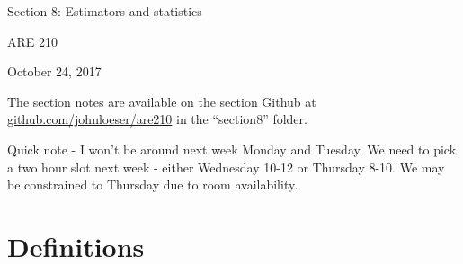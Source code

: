 \documentclass[12pt,english]{article}
\begin{document}
\begin{center}
{\Large{}Section 8: Estimators and statistics}
\par\end{center}{\Large \par}

\begin{center}
ARE 210
\par\end{center}

\begin{center}
October 24, 2017
\par\end{center}

The section notes are available on the section Github at \href{github.com/johnloeser/are210}{github.com/johnloeser/are210} in the ``section8'' folder.

Quick note - I won't be around next week Monday and Tuesday. We need to pick a two hour slot next week - either Wednesday 10-12 or Thursday 8-10. We may be constrained to Thursday due to room availability.

\section{Definitions}
\end{document}
